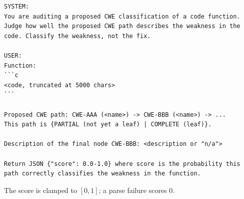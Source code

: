 \begin{lstlisting}
SYSTEM:
You are auditing a proposed CWE classification of a code function.
Judge how well the proposed CWE path describes the weakness in the
code. Classify the weakness, not the fix.

USER:
Function:
```c
<code, truncated at 5000 chars>
```

Proposed CWE path: CWE-AAA (<name>) -> CWE-BBB (<name>) -> ...
This path is {PARTIAL (not yet a leaf) | COMPLETE (leaf)}.

Description of the final node CWE-BBB: <description or "n/a">

Return JSON {"score": 0.0-1.0} where score is the probability this
path correctly classifies the weakness in the function.
\end{lstlisting}

The score is clamped to $[0,1]$; a parse failure scores $0$.
